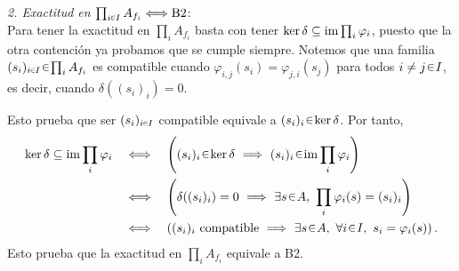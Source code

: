 \begin{sol}
\medskip
\noindent\emph{2. Exactitud en $\prod_{i\en I}A_{f_i}\Longleftrightarrow\mathrm{B2}$}:\\
Para tener la exactitud en $\prod_i A_{f_i}$ basta con tener $\ker\delta\subseteq\operatorname{im}\prod_i\varphi_i$, puesto que la otra contención ya probamos que se cumple siempre. Notemos que una familia $(s_i)_{i\en I}\en\prod_i A_{f_i}$ es compatible cuando $\varphi_{i,j}(s_i)=\varphi_{j,i}(s_j)$ para todos $i\ne j\en I$, es decir, cuando $\delta((s_i)_i)=0$.

Esto prueba que ser $(s_i)_{i\en I}$ compatible equivale a $(s_i)_i\en\ker\delta$. Por tanto,
\[
\begin{aligned}
\ker\delta\subseteq\im\prod_i\varphi_i
&\quad\Longleftrightarrow\quad
\left((s_i)_i\en\ker\delta\ \Longrightarrow\ (s_i)_i\en\im\prod_i\varphi_i\right)\\
&\quad\Longleftrightarrow\quad
\left(\delta((s_i)_i)=0\ \Longrightarrow\ \exists s\en A,\ \prod_i\varphi_i(s)=(s_i)_i\right)\\
&\quad\Longleftrightarrow\quad
\left((s_i)_i\text{ compatible}\ \Longrightarrow\ \exists s\en A,\ \forall i\en I,\ s_i=\varphi_i(s)\right).
\end{aligned}
\]
Esto prueba que la exactitud en $\prod_i A_{f_i}$ equivale a B2.
\end{sol}
